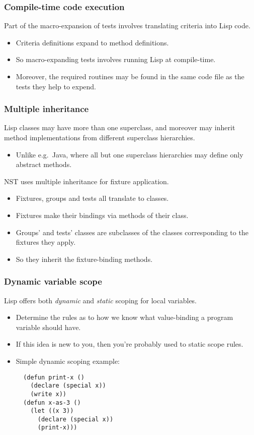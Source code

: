\documentclass{beamer}
\begin{document}
\begin{frame}
  \frametitle{Compile-time code execution}

  Part of the macro-expansion of tests involves translating criteria
  into Lisp code.
  \begin{itemize}
  \item Criteria definitions expand to method definitions.
  \item So macro-expanding tests involves running Lisp at
    compile-time.
  \item Moreover, the required routines may be found in the same code
    file as the tests they help to expend.
  \end{itemize}
\end{frame}

\begin{frame}
  \frametitle{Multiple inheritance}
  
  Lisp classes may have more than one superclass, and moreover may
  inherit method implementations from different superclass
  hierarchies.
  \begin{itemize}
  \item Unlike e.g.\ Java, where all but one superclass hierarchies
    may define only abstract methods.
  \end{itemize}
  NST uses multiple inheritance for fixture application.
  \begin{itemize}
  \item Fixtures, groups and tests all translate to classes.
  \item Fixtures make their bindings via methods of their class.
  \item Groups' and tests' classes are subclasses of the classes
    corresponding to the fixtures they apply.
  \item So they inherit the fixture-binding methods.
  \end{itemize}
\end{frame}

\begin{frame}[fragile]
  \frametitle{Dynamic variable scope}
  
  Lisp offers both \emph{dynamic} and \emph{static} scoping for local
  variables.
  \begin{itemize}
  \item Determine the rules as to how we know what value-binding a
    program variable should have.
  \item If this idea is new to you, then you're probably used to
    static scope rules.
  \item Simple dynamic scoping example:
{\small \begin{verbatim}
  (defun print-x ()
    (declare (special x))
    (write x))
  (defun x-as-3 ()
    (let ((x 3))
      (declare (special x))
      (print-x)))
\end{verbatim}}
  \end{itemize}
\end{frame}
\end{document}
